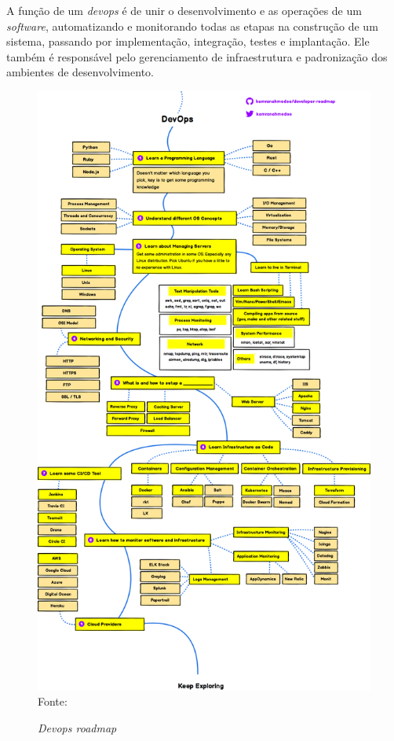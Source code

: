 \documentclass[
	12pt,				%
	openright,			%
	twoside,			%
	a4paper,			%
	english,			%
	brazil				%
	]{abntex2}
\begin{document}
A função de um \textit{devops} é de unir o desenvolvimento e as operações de um \textit{software}, automatizando e monitorando todas as etapas na construção de um sistema, passando por implementação, integração, testes e implantação. Ele também é responsável pelo gerenciamento de infraestrutura e padronização dos ambientes de desenvolvimento.

\begin{figure}[h!]
	\centering

	\caption{\textit{Devops roadmap}} \label{fig:DevopsRoadmap}
    \includegraphics[scale=0.29]{devops-roadmap} \\
    Fonte: {\cite{ahmedse_roadmap}}

\end{figure}
\end{document}
